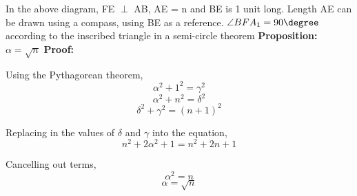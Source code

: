 \documentclass[12pt, a4paper]{article}
\begin{document}
\noindent In the above diagram, FE $\perp$ AB, AE = n and BE is 1 unit long. Length AE can be drawn using a compass, using BE as a reference. $\angle BFA_1 = 90\degree$ according to the inscribed triangle in a semi-circle theorem
\bigbreak
\noindent\textbf{Proposition: } $\alpha = \sqrt{n}$
\bigbreak
\noindent\textbf{Proof:} 

Using the Pythagorean theorem,
\[
\alpha^2 + 1^2 = \gamma^2
\]
\[
\alpha^2 + n^2 = \delta^2
\]
\[
\delta^2 + \gamma^2 = (n+1)^2
\]

Replacing in the values of $\delta$ and $\gamma$ into the equation,
\[
n^2 + 2\alpha^2 + 1 = n^2 + 2n + 1
\]

Cancelling out terms,
\[
\alpha^2 = n
\]
\[
\alpha = \sqrt{n}
\]
\end{document}

